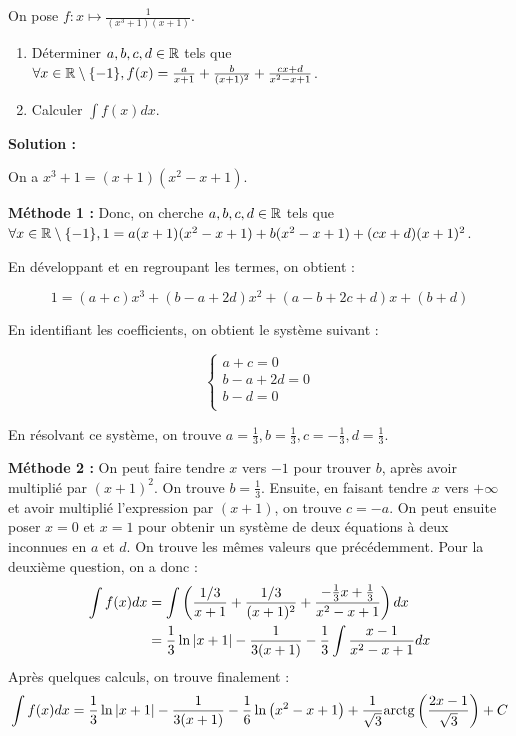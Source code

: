 \documentclass[12pt, a4paper]{report}
\begin{document}
\begin{exercise}
    On pose $f:x\mapsto \frac{1}{(x^3+1)(x+1)}$.

    \begin{enumerate}
        \item Déterminer $a,b,c,d\in\mathbb{R}$ tels que $\forall x\in\mathbb{R}\setminus\{-1\}, f(x)=\frac{a}{x+1}+\frac{b}{(x+1)^2}+\frac{cx+d}{x^2 - x + 1}$.
        \item Calculer $\int f(x)dx$.
    \end{enumerate}

    \textbf{Solution :}

    \begin{outline}
        \1 On a $x^3+1=(x+1)(x^2 - x + 1)$.

        \2 \textbf{Méthode 1 :} Donc, on cherche $a,b,c,d\in\mathbb{R}$ tels que $\forall x\in\mathbb{R}\setminus\{-1\}, 1 = a(x+1)(x^2 - x + 1) + b(x^2 - x + 1) + (cx + d)(x+1)^2$.

        En développant et en regroupant les termes, on obtient :

        $$1 = (a+c)x^3 + (b - a + 2d)x^2 + (a - b + 2c + d)x + (b + d)$$

        En identifiant les coefficients, on obtient le système suivant :

        $$\begin{cases}
            a + c = 0 \\
            b - a + 2d = 0 \\
            b - d = 0 \\
        \end{cases}$$

        En résolvant ce système, on trouve $a = \frac{1}{3}, b = \frac{1}{3}, c = -\frac{1}{3}, d = \frac{1}{3}$.

        \2 \textbf{Méthode 2 :} On peut faire tendre $x$ vers $-1$ pour trouver $b$, après avoir multiplié par $(x+1)^2$. On trouve $b=\frac{1}{3}$. Ensuite, en faisant tendre $x$ vers $+\infty$ et avoir multiplié l'expression par $(x+1)$, on trouve $c=-a$. On peut ensuite poser $x=0$ et $x=1$ pour obtenir un système de deux équations à deux inconnues en $a$ et $d$. On trouve les mêmes valeurs que précédemment.
    \1 Pour la deuxième question, on a donc :
        \begin{align*}
            \int f(x) dx &= \int \left(\frac{1/3}{x+1} + \frac{1/3}{(x+1)^2} + \frac{-\frac{1}{3}x + \frac{1}{3}}{x^2 - x + 1}\right) dx \\
            &= \frac{1}{3} \ln\left|x+1\right| - \frac{1}{3(x+1)} -\frac{1}{3}\int \frac{x-1}{x^2 - x + 1} dx
        \end{align*}
        \2 Après quelques calculs, on trouve finalement :
        $$\int f(x) dx = \frac{1}{3} \ln\left|x+1\right| - \frac{1}{3(x+1)} - \frac{1}{6} \ln\left(x^2 - x + 1\right) + \frac{1}{\sqrt{3}} \mathrm{arctg}\left(\frac{2x - 1}{\sqrt{3}}\right) + C$$
    \end{outline}
\end{exercise}
\end{document}

